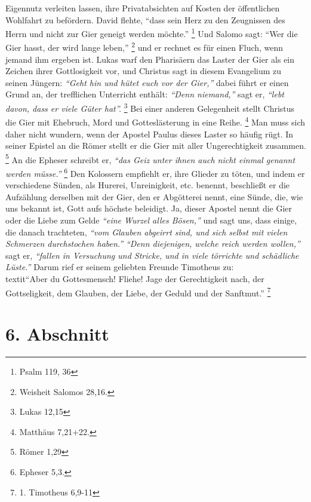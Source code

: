 Eigennutz verleiten lassen, ihre Privatabsichten auf Kosten der öffentlichen
Wohlfahrt zu befördern. David flehte,
"`dass sein Herz zu den Zeugnissen des
Herrn und nicht zur Gier geneigt werden möchte."'
\footnote{Psalm 119, 36}
Und
Salomo sagt:
"`Wer die Gier hasst, der wird lange leben,"'
\footnote{Weisheit Salomos 28,16.}
und er rechnet es für einen Fluch, wenn jemand ihm ergeben ist. Lukas
warf den Pharisäern das Laster der Gier als ein
Zeichen ihrer Gottlosigkeit
vor, und Christus sagt in diesem Evangelium zu seinen Jüngern:
\textit{"`Geht hin und
hütet euch vor der Gier,"'} dabei führt er einen Grund an, der trefflichen
Unterricht enthält: \textit{"`Denn niemand,"'} sagt er,
\textit{"`lebt davon, dass er viele Güter hat"'.}
\footnote{Lukas 12,15}
Bei einer anderen Gelegenheit stellt Christus die Gier mit Ehebruch, Mord und
Gotteslästerung in eine Reihe.
\footnote{Matthäus 7,21+22.}
Man muss sich daher nicht wundern, wenn der Apostel Paulus dieses
Laster so häufig rügt. In seiner Epistel an die Römer stellt er die Gier mit
aller Ungerechtigkeit zusammen.
\footnote{Römer 1,29}
An die Epheser schreibt er,
\textit{"`das Geiz unter ihnen auch nicht einmal genannt werden müsse."'}
\footnote{Epheser 5,3.}
Den Kolossern empfiehlt er, ihre Glieder zu töten, und indem er
verschiedene Sünden, als Hurerei, Unreinigkeit, etc. benennt, beschließt er
die Aufzählung derselben mit der Gier, den er Abgötterei
nennt, eine Sünde,
die, wie uns bekannt ist, Gott aufs höchste beleidigt. Ja, dieser Apostel nennt
die Gier oder die Liebe zum Gelde \textit{"`eine Wurzel alles Bösen,"'}
 und sagt uns, dass
einige, die danach trachteten, \textit{"`vom Glauben abgeirrt sind, und sich
selbst
mit vielen Schmerzen durchstochen haben."'} \textit{"`Denn diejenigen, welche
reich
werden wollen,"'} sagt er, \textit{"`fallen in Versuchung und Stricke, und in
viele
törrichte und schädliche Lüste."'} Darum rief er seinem geliebten Freunde
Timotheus zu:\\textit{"`Aber du Gottesmensch! Fliehe! Jage der
Gerechtigkeit
nach, der Gottseligkeit, dem Glauben, der Liebe, der Geduld und der
Sanftmut."'}
\footnote{1. Timotheus 6,9-11}

\section{6. Abschnitt} \label{kap13_ab6}

